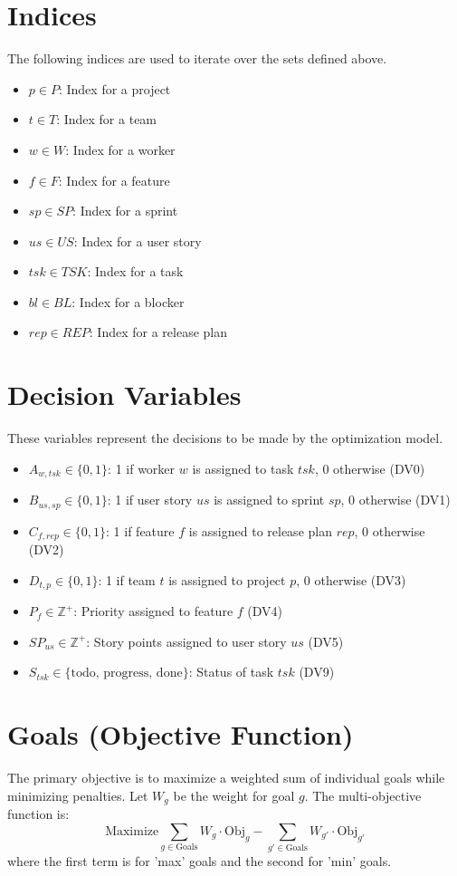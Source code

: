 \documentclass{article}
\begin{document}
\section{Indices}
The following indices are used to iterate over the sets defined above.
\begin{itemize}
    \item $p \in P$: Index for a project
    \item $t \in T$: Index for a team
    \item $w \in W$: Index for a worker
    \item $f \in F$: Index for a feature
    \item $sp \in SP$: Index for a sprint
    \item $us \in US$: Index for a user story
    \item $tsk \in TSK$: Index for a task
    \item $bl \in BL$: Index for a blocker
    \item $rep \in REP$: Index for a release plan
\end{itemize}

\section{Decision Variables}
These variables represent the decisions to be made by the optimization model.
\begin{itemize}
    \item $A_{w, tsk} \in \{0,1\}$: 1 if worker $w$ is assigned to task $tsk$, 0 otherwise (DV0)
    \item $B_{us, sp} \in \{0,1\}$: 1 if user story $us$ is assigned to sprint $sp$, 0 otherwise (DV1)
    \item $C_{f, rep} \in \{0,1\}$: 1 if feature $f$ is assigned to release plan $rep$, 0 otherwise (DV2)
    \item $D_{t, p} \in \{0,1\}$: 1 if team $t$ is assigned to project $p$, 0 otherwise (DV3)
    \item $P_f \in \mathbb{Z}^+$: Priority assigned to feature $f$ (DV4)
    \item $SP_{us} \in \mathbb{Z}^+$: Story points assigned to user story $us$ (DV5)
    \item $S_{tsk} \in \{\text{todo, progress, done}\}$: Status of task $tsk$ (DV9)
\end{itemize}

\section{Goals (Objective Function)}
The primary objective is to maximize a weighted sum of individual goals while minimizing penalties.
Let $W_g$ be the weight for goal $g$. The multi-objective function is:
$$ \text{Maximize} \sum_{g \in \text{Goals}} W_g \cdot \text{Obj}_g - \sum_{g' \in \text{Goals}} W_{g'} \cdot \text{Obj}_{g'} $$
where the first term is for 'max' goals and the second for 'min' goals.
\end{document}
